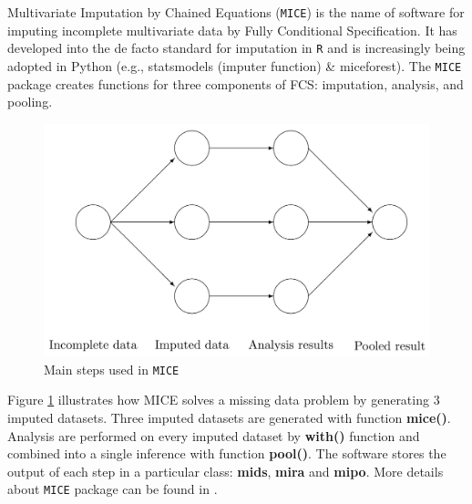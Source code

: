 	Multivariate Imputation by Chained Equations (\texttt{MICE}) is the name of software for imputing incomplete multivariate data by Fully Conditional Specification. It has developed into the de facto standard for imputation in \texttt{R} and is increasingly being adopted in Python (e.g., statsmodels (imputer function) \& miceforest). The \texttt{MICE} package creates functions for three components of FCS: imputation, analysis, and pooling. 
	\begin{figure}[ht!]
		\centering
		\includegraphics[scale=.2]{plots/miflow}
		\caption{Main steps used in \texttt{MICE} \citep{Buuren2011}}
		\label{fig6_1}
	\end{figure} 
	Figure \ref{fig6_1} illustrates how MICE solves a missing data problem by generating 3 imputed datasets. Three imputed datasets are generated with function \textbf{mice()}. Analysis are performed on every imputed dataset by \textbf{with()} function and combined into a single inference with function \textbf{pool()}. The software stores the output of each step in a particular class: \textbf{mids}, \textbf{mira} and \textbf{mipo}. More details about \texttt{MICE} package can be found in \citet{Buuren2011}.
	
